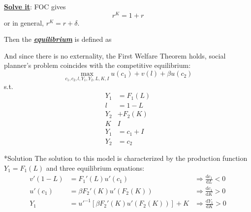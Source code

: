 \documentclass[10pt,landscape,a4paper]{article}
\makeatletter
\renewcommand{\subsubsection}{\@startsection{subsubsection}{1}{0mm}{.2ex}{.2ex}{\bfseries}}
\makeatother
\begin{document}
\begin{multicols*}{3}
\underline{\textbf{Solve it}}: FOC gives
$$r^K=1+r$$
or in general, $r^K=r+\delta$.

\vspace{2pt}
Then the \underline{\textbf{\textit{equilibrium}}} is defined as

\vspace{2pt}

And since there is no externality, the First Welfare Theorem holds, social planner's problem coincides with the competitive equilibrium:
$$
\max_{c_1,c_2,l,Y_1,Y_2,L,K,I}u(c_1)+v(l)+\beta u(c_2)
$$
s.t.
\begin{align*}
    Y_1 &=F_1(L)\\
    l&=1-L\\
    Y_2 &+F_2(K)\\
    K&I\\
    Y_1 &= c_1+I\\
    Y_2 &=c_2
\end{align*}

\subsubsection*{Solution}
The solution to this model is characterized by the production function $Y_1=F_1(L)$ and three equilibrium equations:
\begin{align*}
    v'(1-L)&=F_1'(L)u'(c_1) & \Rightarrow \frac{\mathrm{d}c_1}{\mathrm{d}L}<0\\
    u'(c_1)&=\beta F_2'(K)u'(F_2(K)) & \Rightarrow \frac{\mathrm{d}c_1}{\mathrm{d}K}>0\\
    Y_1 &= u'^{-1}\left[\beta F_2'(K)u'(F_2(K))\right]+K & \Rightarrow \frac{\mathrm{d}Y_1}{\mathrm{d}K}>0
\end{align*}


\end{multicols*}
\end{document}
